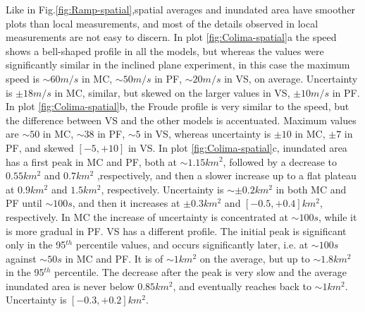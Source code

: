 \documentclass{article}
\begin{document}
Like in Fig.\ref{fig:Ramp-spatial},spatial averages and inundated area have smoother plots than local measurements, and most of the details observed in local measurements are not easy to discern. In plot \ref{fig:Colima-spatial}a the speed shows a bell-shaped profile in all the models, but whereas the values were significantly similar in the inclined plane experiment, in this case the maximum speed is $\sim 60 m/s$ in MC, $\sim 50 m/s$ in PF, $\sim 20 m/s$ in VS, on average. Uncertainty is $\pm 18 m/s$ in MC, similar, but skewed on the larger values in VS, $\pm 10 m/s$ in PF. In plot \ref{fig:Colima-spatial}b, the Froude profile is very similar to the speed, but the difference between VS and the other models is accentuated. Maximum values are $\sim 50$ in MC, $\sim 38$ in PF, $\sim 5$ in VS, whereas uncertainty is $\pm 10$ in MC, $\pm 7$ in PF, and skewed $[-5, +10]$ in VS. In plot \ref{fig:Colima-spatial}c, inundated area has a first peak in MC and PF, both at $\sim 1.15 km^2$, followed by a decrease to $0.55 km^2$ and $0.7 km^2$ ,respectively, and then a slower increase up to a flat plateau at $0.9 km^2$ and $1.5 km^2$, respectively. Uncertainty is $\sim \pm 0.2 km^2$ in both MC and PF until $\sim 100 s$, and then it increases at $\pm 0.3 km^2$ and $[-0.5, +0.4] km^2$, respectively. In MC the increase of uncertainty is concentrated at $\sim 100 s$, while it is more gradual in PF. VS has a different profile. The initial peak is significant only in the 95$^{th}$ percentile values, and occurs significantly later, i.e. at $\sim 100 s$ against $\sim 50 s$ in MC and PF. It is of $\sim 1 km^2$ on the average, but up to $\sim 1.8 km^2$ in the 95$^{th}$ percentile. The decrease after the peak is very slow and the average inundated area is never below $0.85 km^2$, and eventually reaches back to $\sim 1 km^2$. Uncertainty is $[-0.3, +0.2] km^2$.
\end{document}
